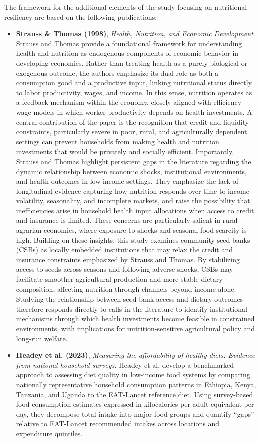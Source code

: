 \documentclass{article}
\begin{document}
The framework for the additional elements of the study focusing on nutritional resiliency are based on the following publications:\begin{itemize}
    \item \textbf{Strauss \& Thomas (1998)}, \textit{Health, Nutrition, and Economic Development}. Strauss and Thomas provide a foundational framework for understanding health and nutrition as endogenous components of economic behavior in developing economies. Rather than treating health as a purely biological or exogenous outcome, the authors emphasize its dual role as both a consumption good and a productive input, linking nutritional status directly to labor productivity, wages, and income. In this sense, nutrition operates as a feedback mechanism within the economy, closely aligned with efficiency wage models in which worker productivity depends on health investments. A central contribution of the paper is the recognition that credit and liquidity constraints, particularly severe in poor, rural, and agriculturally dependent settings can prevent households from making health and nutrition investments that would be privately and socially efficient. 
    Importantly, Strauss and Thomas highlight persistent gaps in the literature regarding the dynamic relationship between economic shocks, institutional environments, and health outcomes in low-income settings. They emphasize the lack of longitudinal evidence capturing how nutrition responds over time to income volatility, seasonality, and incomplete markets, and raise the possibility that inefficiencies arise in household health input allocations when access to credit and insurance is limited. These concerns are particularly salient in rural agrarian economies, where exposure to shocks and seasonal food scarcity is high.
    Building on these insights, this study examines community seed banks (CSBs) as locally embedded institutions that may relax the credit and insurance constraints emphasized by Strauss and Thomas. By stabilizing access to seeds across seasons and following adverse shocks, CSBs may facilitate smoother agricultural production and more stable dietary composition, affecting nutrition through channels beyond income alone. Studying the relationship between seed bank access and dietary outcomes therefore responds directly to calls in the literature to identify institutional mechanisms through which health investments become feasible in constrained environments, with implications for nutrition-sensitive agricultural policy and long-run welfare.
    \item \textbf{Headey et al. (2023)}, \textit{Measuring the affordability of healthy diets: Evidence from national household surveys.} Headey et al. develop a benchmarked approach to assessing diet quality in low-income food systems by comparing nationally representative household consumption patterns in Ethiopia, Kenya, Tanzania, and Uganda to the EAT-Lancet reference diet. Using survey-based food consumption estimates expressed in kilocalories per adult-equivalent per day, they decompose total intake into major food groups and quantify “gaps” relative to EAT-Lancet recommended intakes across locations and expenditure quintiles.


\end{itemize}
\end{document}
